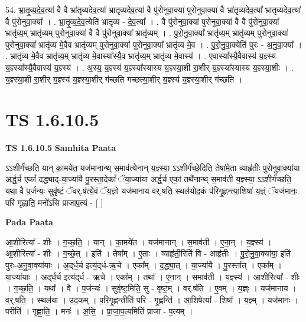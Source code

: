 \documentclass[17pt]{extarticle}
\begin{document}
54. भ्रा॒तृ॒व्य॒दे॒व॒त्या॑ वै वै भ्रा॑तृव्यदेव॒त्या᳚ भ्रातृव्यदेव॒त्या॑ वै पु॑रोनुवा॒क्या॑ पुरोनुवा॒क्या॑ वै भ्रा॑तृव्यदेव॒त्या᳚ भ्रातृव्यदेव॒त्या॑ वै पु॑रोनुवा॒क्या᳚ । . भ्रा॒तृ॒व्य॒दे॒व॒त्येति॑ भ्रातृव्य - दे॒व॒त्या᳚ । . वै पु॑रोनुवा॒क्या॑ पुरोनुवा॒क्या॑ वै वै पु॑रोनुवा॒क्या᳚ भ्रातृ॑व्य॒म् भ्रातृ॑व्यम् पुरोनुवा॒क्या॑ वै वै पु॑रोनुवा॒क्या᳚ भ्रातृ॑व्यम् । . पु॒रो॒नु॒वा॒क्या᳚ भ्रातृ॑व्य॒म् भ्रातृ॑व्यम् पुरोनुवा॒क्या॑ पुरोनुवा॒क्या᳚ भ्रातृ॑व्य मे॒वैव भ्रातृ॑व्यम् पुरोनुवा॒क्या॑ पुरोनुवा॒क्या᳚ भ्रातृ॑व्य मे॒व । . पु॒रो॒नु॒वा॒क्येति॑ पुरः - अ॒नु॒वा॒क्या᳚ । . भ्रातृ॑व्य मे॒वैव भ्रातृ॑व्य॒म् भ्रातृ॑व्य मे॒वास्या᳚स्यै॒व भ्रातृ॑व्य॒म् भ्रातृ॑व्य मे॒वास्य॑ । . ए॒वास्या᳚स्यै॒वैवास्य॑ य॒ज्ञ्स्य॑ य॒ज्ञ्स्या᳚स्यै॒वैवास्य॑ य॒ज्ञ्स्य॑ । . अ॒स्य॒ य॒ज्ञ्स्य॑ य॒ज्ञ्स्या᳚स्यास्य य॒ज्ञ्स्या॒शी रा॒शीर् य॒ज्ञ्स्या᳚स्यास्य य॒ज्ञ्स्या॒शीः । . य॒ज्ञ्स्या॒शी रा॒शीर् य॒ज्ञ्स्य॑ य॒ज्ञ्स्या॒शीर् ग॑च्छति गच्छत्या॒शीर् य॒ज्ञ्स्य॑ य॒ज्ञ्स्या॒शीर् ग॑च्छति । \newline
\pagebreak
{}

\section{ TS 1.6.10.5 }

\textbf{TS 1.6.10.5 } \newline
\textbf{Samhita Paata} \newline

ऽऽशीर्ग॑च्छति॒ यान् का॒मये॑त॒ यज॑मानान्थ् स॒माव॑त्येनान् य॒ज्ञ्स्या॒ ऽऽशीर्ग॑च्छे॒दिति॒ तेषा॑मे॒ता व्याहृ॑तीः पुरोनुवा॒क्या॑या अर्द्ध॒र्च एकां᳚ दद्ध्याद्-या॒ज्या॑यै पु॒रस्ता॒देकां᳚ ॅया॒ज्या॑या अर्द्ध॒र्च एकां॒ तथै॑नान्थ् स॒माव॑ती य॒ज्ञ्स्या॒ ऽऽशीर्ग॑च्छति॒ यथा॒ वै प॒र्जन्यः॒ सुवृ॑ष्टं॒ ॅवर्.ष॑त्ये॒वं ॅय॒ज्ञो यज॑मानाय वर्.षति॒ स्थल॑योद॒कं प॑रिगृ॒ह्णन्त्या॒शिषा॑ य॒ज्ञ्ं ॅयज॑मानः॒ परि॑ गृह्णाति॒ मनो॑ऽसि प्राजाप॒त्यं - [ ] \newline

\textbf{Pada Paata} \newline

आ॒शीरित्या᳚ - शीः । ग॒च्छ॒ति॒ । यान् । का॒मये॑त । यज॑मानान् । स॒माव॑ती । ए॒ना॒न् । य॒ज्ञ्स्य॑ । आ॒शीरित्या᳚ - शीः । ग॒च्छे॒त् । इति॑ । तेषा᳚म् । ए॒ताः । व्याहृ॑ती॒रिति॑ वि - आहृ॑तीः । पु॒रो॒नु॒वा॒क्या॑या॒ इति॑ पुरः-अ॒नु॒वा॒क्या॑याः । अ॒द्‌र्ध॒र्च इत्य॒॑द्‌र्ध-ऋ॒चे । एका᳚म् । द॒द्ध्या॒त् । या॒ज्या॑यै । पु॒रस्ता᳚त् । एका᳚म् । या॒ज्या॑याः । अ॒द्‌र्ध॒र्च इत्य॑द्‌र्ध - ऋ॒चे । एका᳚म् । तथा᳚ । ए॒ना॒न् । स॒माव॑ती । य॒ज्ञ्स्य॑ । आ॒शीरित्या᳚ - शीः । ग॒च्छ॒ति॒ । यथा᳚ । वै । प॒र्जन्यः॑ । सुवृ॑ष्ट॒मिति॒ सु - वृ॒ष्ट॒म् । वर्.ष॑ति । ए॒वम् । य॒ज्ञ्ः । यज॑मानाय । व॒र्॒.ष॒ति॒ । स्थल॑या । उ॒द॒कम् । प॒रि॒गृ॒ह्णन्तीति॑ परि - गृ॒ह्णन्ति॑ । आ॒शिषेत्या᳚ - शिषा᳚ । य॒ज्ञ्म् । यज॑मानः । परीति॑ । गृ॒ह्णा॒ति॒ । मनः॑ । अ॒सि॒ । प्रा॒जा॒प॒त्यमिति॑ प्राजा - प॒त्यम् ।  \newline
\end{document}

